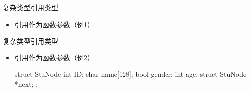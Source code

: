 \begin{frame}[t, fragile]{复杂类型}{引用类型}
  \begin{itemize}
  \item 引用作为函数参数（例1）\\[-0.5ex]
    \begin{center}
    \end{center}
  \end{itemize}
\end{frame}



\begin{frame}[t, fragile]{复杂类型}{引用类型}
  \begin{itemize}
  \item 引用作为函数参数（例2）\\
    \begin{center}
      \begin{minipage}{0.35\linewidth}
        \begin{cppcode}
struct StuNode
{
    int ID;
    char name[128];
    bool gender;
    int age;
    struct StuNode *next;
};
        \end{cppcode}
      \end{minipage}\qquad
      \begin{minipage}{0.5\linewidth}
      \end{minipage}
    \end{center}
  \end{itemize}
\end{frame}


